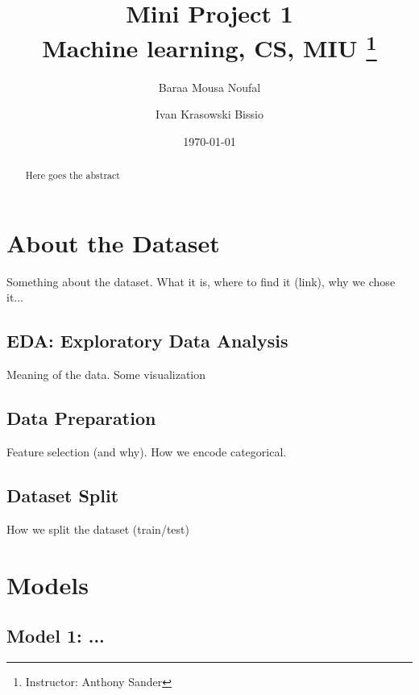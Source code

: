 


\title{
	Mini Project 1 \\
	Machine learning, CS, MIU \thanks{Instructor: Anthony Sander}
}

\author{Baraa Mousa Noufal \and Ivan Krasowski Bissio}
\date{\today}


\maketitle
\tableofcontents

\begin{abstract}

    Here goes the abstract

\end{abstract}

\section{About the Dataset}
Something about the dataset. What it is, where to find it (link), why we chose it...

\subsection{EDA: Exploratory Data Analysis}
Meaning of the data. Some visualization

\subsection{Data Preparation}
Feature selection (and why). How we encode categorical.

\subsection{Dataset Split}
How we split the dataset (train/test)

\section{Models}
\subsection{Model 1: ...}

